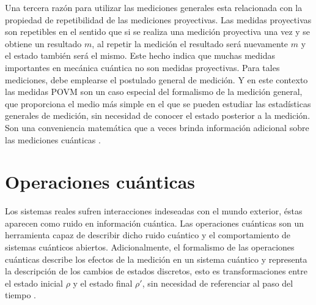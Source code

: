 Una tercera razón para utilizar las mediciones generales esta relacionada con la propiedad de repetibilidad de las mediciones proyectivas. Las medidas proyectivas son repetibles en el sentido que si se realiza una medición proyectiva una vez y se obtiene un resultado $m$, al repetir la medición el resultado será nuevamente $m$ y el estado también será el mismo. Este hecho indica que muchas medidas importantes en mecánica cuántica no son medidas proyectivas.  Para tales mediciones, debe emplearse el postulado general de medición. Y en este contexto las medidas POVM son un caso especial del formalismo de la medición general, que proporciona el medio más simple en el que se pueden estudiar las estadísticas generales de medición, sin necesidad de conocer el estado posterior a la medición. Son una conveniencia matemática que a veces brinda información adicional sobre las mediciones cuánticas {\cite{nielsen_chuang_2010}}.


\section{Operaciones cuánticas}\label{sec:Cap1:OpCuanticas} %

Los sistemas reales sufren interacciones indeseadas con el mundo exterior, éstas aparecen como ruido en información cuántica. Las operaciones cuánticas son un herramienta capaz de describir dicho ruido cuántico y el comportamiento de sistemas cuánticos abiertos.  Adicionalmente, el formalismo de las operaciones cuánticas describe los efectos de la medición en un sistema cuántico y representa la descripción de los cambios  de estados discretos, esto es transformaciones entre el estado inicial $\rho$ y el estado final $\rho'$, sin necesidad de referenciar al paso del tiempo
{\cite{nielsen_chuang_2010}}.

